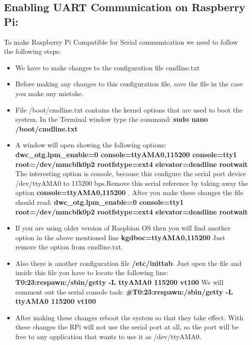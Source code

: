 \documentclass[11pt,a4paper]{article}
\begin{document}
	\subsection{Enabling UART Communication on Raspberry Pi:}
	To make Raspberry Pi Compatible for Serial communication we need to follow the following steps:
	\begin{itemize}
		\item We have to make changes to the configuration file cmdline.txt
		\item Before making any changes to this configuration file, save the file in the case you make any mistake.
		\item File /boot/cmdline.txt contains the kernel options that are used to boot the system.
		\newline In the Terminal window type the command:
		\newline \textbf{sudo nano /boot/cmdline.txt}
		\item A window will open showing the following options:
		\newline \textbf{dwc\_otg.lpm\_enable=0 console=ttyAMA0,115200 console=tty1 root=/dev/mmcblk0p2 rootfstype=ext4 elevator=deadline rootwait}
		\newline The interesting option is console, because this configure the serial port device /dev/ttyAMA0 to 115200 bps.Remove this serial reference by taking away the option \textbf{console=ttyAMA0,115200 }. After you make these changes the file should read:
		\newline \textbf{dwc\_otg.lpm\_enable=0 console=tty1 root=/dev/mmcblk0p2 rootfstype=ext4 elevator=deadline rootwait}
		\item If you are using older version of Raspbian OS then you will find another option in the above mentioned line \newline \textbf{kgdboc=ttyAMA0,115200}
		\newline Just remove the option from cmdline.txt.
		\item Also there is another configuration file \textbf{/etc/inittab}. Just open the file and inside this file you have to locate the following line: 
		\newline \textbf{T0:23:respawn:/sbin/getty -L ttyAMA0 115200 vt100}
		\newline We will comment out the serial console task:
		\newline \textbf{\#T0:23:respawn:/sbin/getty -L ttyAMA0 115200 vt100}
		\item After making these changes reboot the system so that they take effect. With these changes the RPi will not use the serial port at all, so the port will be free to any application that wants to use it as /dev/ttyAMA0.

\end{itemize}
\end{document}
